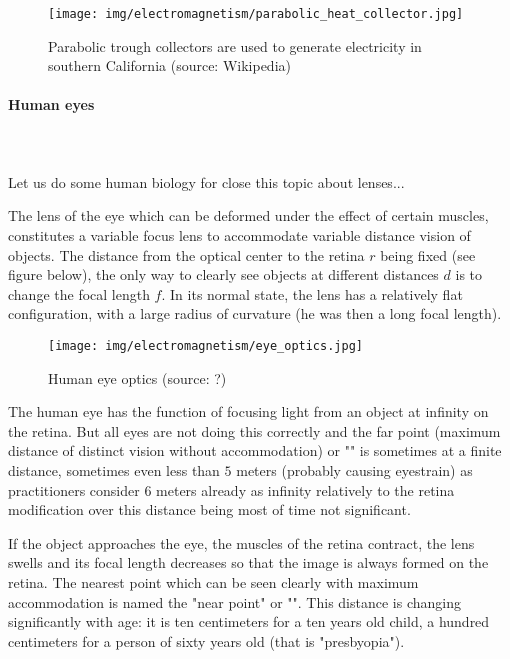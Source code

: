 	\begin{figure}[H]
		\centering
		\texttt{[image: img/electromagnetism/parabolic\_heat\_collector.jpg]}
		\caption{Parabolic trough collectors are used to generate electricity in southern California (source: Wikipedia)}
	\end{figure}
	
	
	\pagebreak
	\paragraph{Human eyes}\mbox{}\\\\
	Let us do some human biology for close this topic about lenses...

	The lens of the eye which can be deformed under the effect of certain muscles, constitutes a variable focus lens to accommodate variable distance vision of objects. The distance from the optical center to the retina $r$ being fixed (see figure below), the only way to clearly see objects at different distances $d$ is to change the focal length $f$. In its normal state, the lens has a relatively flat configuration, with a large radius of curvature (he was then a long focal length).
	\begin{figure}[H]
		\centering
		\texttt{[image: img/electromagnetism/eye\_optics.jpg]}
		\caption{Human eye optics (source: ?)}
	\end{figure}
	The human eye has the function of focusing light from an object at infinity on the retina. But all eyes are not doing this correctly and the far point (maximum distance of distinct vision without accommodation) or "" is sometimes at a finite distance, sometimes even less than $5$ meters (probably causing eyestrain) as practitioners consider $6$ meters already as infinity relatively to the retina modification over this distance being most of time not significant.
	
	If the object approaches the eye, the muscles of the retina contract, the lens swells and its focal length decreases so that the image is always formed on the retina. The nearest point which can be seen clearly with maximum accommodation is named the "near point" or "". This distance is changing significantly with age: it is ten centimeters for a ten years old child, a hundred centimeters for a person of sixty years old (that is "presbyopia").
	
